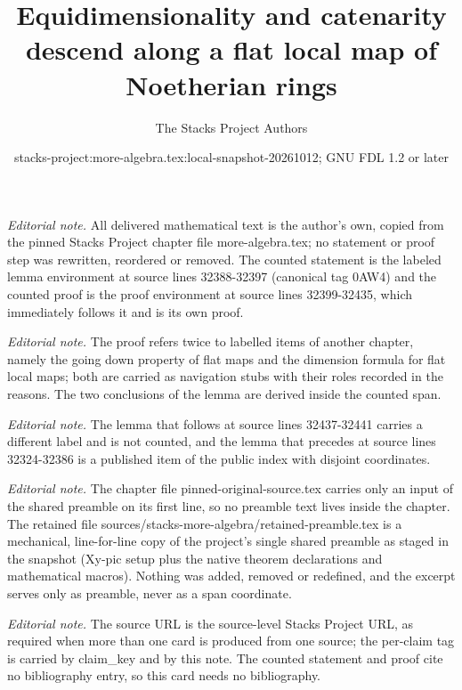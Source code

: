 \documentclass[10pt,a4paper]{amsart}
\title{Equidimensionality and catenarity descend along a flat local map of Noetherian rings}
\author{The Stacks Project Authors}
\date{stacks-project:more-algebra.tex:local-snapshot-20261012; GNU FDL 1.2 or later}
\theoremstyle{plain}
\theoremstyle{definition}
\theoremstyle{remark}
\numberwithin{equation}{subsection}
\begin{document}
\maketitle
\setcounter{subsection}{1}
\noindent\textit{Editorial note.} All delivered mathematical text is the author's own, copied from the pinned Stacks Project chapter file more-algebra.tex; no statement or proof step was rewritten, reordered or removed. The counted statement is the labeled lemma environment at source lines 32388-32397 (canonical tag 0AW4) and the counted proof is the proof environment at source lines 32399-32435, which immediately follows it and is its own proof.\par\medskip
\noindent\textit{Editorial note.} The proof refers twice to labelled items of another chapter, namely the going down property of flat maps and the dimension formula for flat local maps; both are carried as navigation stubs with their roles recorded in the reasons. The two conclusions of the lemma are derived inside the counted span.\par\medskip
\noindent\textit{Editorial note.} The lemma that follows at source lines 32437-32441 carries a different label and is not counted, and the lemma that precedes at source lines 32324-32386 is a published item of the public index with disjoint coordinates.\par\medskip
\noindent\textit{Editorial note.} The chapter file pinned-original-source.tex carries only an input of the shared preamble on its first line, so no preamble text lives inside the chapter. The retained file sources/stacks-more-algebra/retained-preamble.tex is a mechanical, line-for-line copy of the project's single shared preamble as staged in the snapshot (Xy-pic setup plus the native theorem declarations and mathematical macros). Nothing was added, removed or redefined, and the excerpt serves only as preamble, never as a span coordinate.\par\medskip
\noindent\textit{Editorial note.} The source URL is the source-level Stacks Project URL, as required when more than one card is produced from one source; the per-claim tag is carried by claim\_key and by this note. The counted statement and proof cite no bibliography entry, so this card needs no bibliography.\par\medskip
\end{document}
